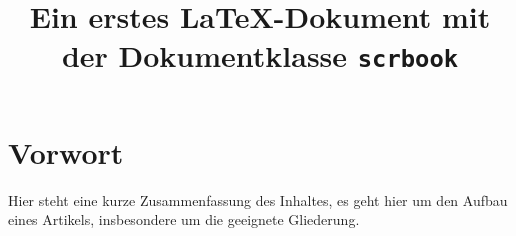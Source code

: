 \documentclass[ngerman]{scrbook}      %
\title{Ein erstes \LaTeX-Dokument mit der Dokumentklasse \texttt{scrbook}}       %
\begin{document}
  \frontmatter                        %
  
  \maketitle                          %
           
  \chapter*{Vorwort}                  %
    Hier steht eine kurze Zusammenfassung des Inhaltes, es geht hier um den Aufbau eines Artikels, insbesondere um die geeignete Gliederung.

  \tableofcontents               

  
\end{document}
